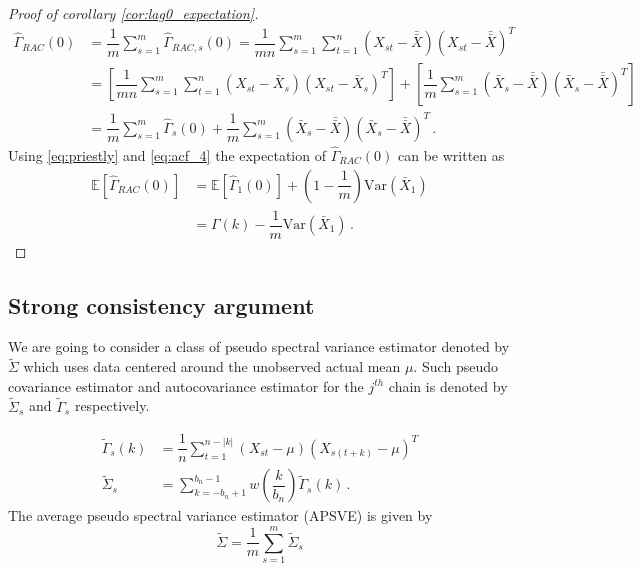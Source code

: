 \documentclass[11pt]{article}
\newcommand{\E}{\mathbb{E}}
\newcommand{\Var}{\text{Var}}
\theoremstyle{remark}
\begin{document}
\begin{proof}[Proof of corollary \ref{cor:lag0_expectation}]

\begin{align*}
    \hat{\Gamma}_{RAC}(0) &= \dfrac{1}{m}\sum_{s=1}^{m}\hat{\Gamma}_{RAC,s}(0) = \dfrac{1}{mn}\sum_{s=1}^{m}\sum_{t=1}^{n}  \left(X_{st} - \bar{\bar{X}}\right)  \left(X_{st} - \bar{\bar{X}}\right)^T\\
    &= \left[\dfrac{1}{mn}\sum_{s=1}^{m}\sum_{t=1}^{n} \left(X_{st} - \bar{X}_s \right)  \left(X_{st} - \bar{X}_s \right)^T\right] + \left[\dfrac{1}{m}\sum_{s=1}^{m} \left(\bar{X}_s - \bar{\bar{X}} \right) \left(\bar{X}_s - \bar{\bar{X}} \right)^T\right]\\
    &= \dfrac{1}{m}\sum_{s=1}^{m}\hat{\Gamma}_s(0)  + \dfrac{1}{m}\sum_{s=1}^{m} \left(\bar{X}_s - \bar{\bar{X}} \right)  \left(\bar{X}_s - \bar{\bar{X}} \right)^T\,.
\end{align*}
Using \eqref{eq:priestly} and \eqref{eq:acf_4} the expectation of $\hat{\Gamma}_{RAC}(0)$ can be written as 
%
\begin{align*}
    \mathbb{E} \left[\hat{\Gamma}_{RAC}(0) \right] &= \E\left[\hat{\Gamma}_1(0) \right] + \left(1-\dfrac{1}{m}\right)\Var(\bar{X}_1) \\
    & = \Gamma(k) - \dfrac{1}{m}\Var(\bar{X}_1)\,.
\end{align*}

\end{proof}


\subsection{Strong consistency argument} \label{appendix:strong_consis}


We are going to consider a class of pseudo spectral variance estimator denoted by $\tilde{\Sigma}$ which uses data centered around the unobserved actual mean $\mu$. Such pseudo covariance estimator and autocovariance estimator for the $j^{th}$ chain is denoted by $\tilde{\Sigma}_s$ and $\tilde{\Gamma}_s$ respectively.

\begin{align*}
    \tilde{\Gamma}_s(k) &= \dfrac{1}{n}\sum_{t=1}^{n-|k|}(X_{st}-\mu)(X_{s(t+k)}-\mu)^T \\ 
    \tilde{\Sigma}_s &= \sum_{k=-b_n+1}^{b_n-1}w\left(\dfrac{k}{b_n}\right)\tilde{\Gamma}_s(k) \,.
\end{align*}
%
The average pseudo spectral variance estimator (APSVE) is given by
\[
\tilde{\Sigma} = \dfrac{1}{m}\sum\limits_{s=1}^{m}\tilde{\Sigma}_s
\]
\end{document}
